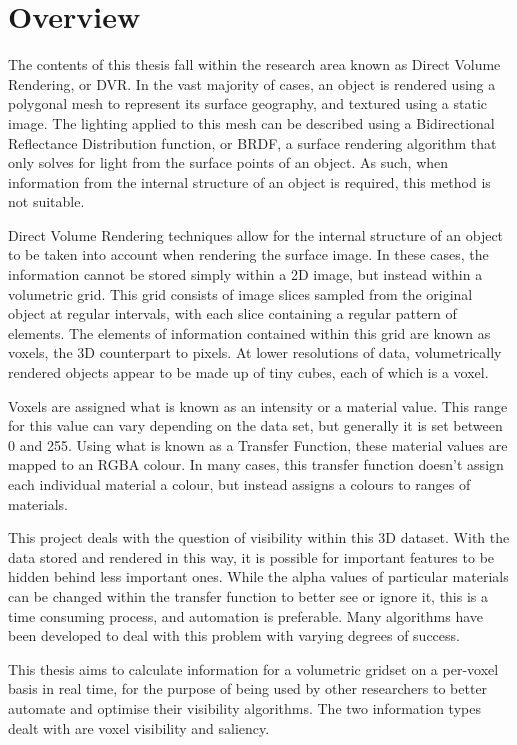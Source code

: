 \chapter{Overview}

The contents of this thesis fall within the research area known as Direct Volume Rendering, or DVR. In the vast majority of cases, an object is rendered using a polygonal mesh to represent its surface geography, and textured using a static image. The lighting applied to this mesh can be described using a Bidirectional Reflectance Distribution function, or BRDF, a surface rendering algorithm that only solves for light from the surface points of an object. As such, when information from the internal structure of an object is required, this method is not suitable.

Direct Volume Rendering techniques allow for the internal structure of an object to be taken into account when rendering the surface image. In these cases, the information cannot be stored simply within a 2D image, but instead within a volumetric grid. This grid consists of image slices sampled from the original object at regular intervals, with each slice containing a regular pattern of elements. The elements of information contained within this grid are known as voxels, the 3D counterpart to pixels. At lower resolutions of data, volumetrically rendered objects appear to be made up of tiny cubes, each of which is a voxel.

Voxels are assigned what is known as an intensity or a material value. This range for this value can vary depending on the data set, but generally it is set between 0 and 255. Using what is known as a Transfer Function, these material values are mapped to an RGBA colour. In many cases, this transfer function doesn't assign each individual material a colour, but instead assigns a colours to ranges of materials. 

This project deals with the question of visibility within this 3D dataset. With the data stored and rendered in this way, it is possible for important features to be hidden behind less important ones. While the alpha values of particular materials can be changed within the transfer function to better see or ignore it, this is a time consuming process, and automation is preferable. Many algorithms have been developed to deal with this problem with varying degrees of success. 

This thesis aims to calculate information for a volumetric gridset on a per-voxel basis in real time, for the purpose of being used by other researchers to better automate and optimise their visibility algorithms. The two information types dealt with are voxel visibility and saliency. 

